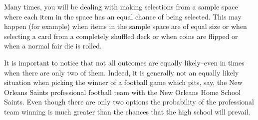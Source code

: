 \documentclass[10pt,]{book}
\theoremstyle{plain}
\theoremstyle{definition}
\theoremstyle{definition}
\theoremstyle{definition}
\numberwithin{equation}{section}
\begin{document}
	Many times, you will be dealing with making selections from a sample space where each item in the space has an equal chance of being selected. This may happen (for example) when items in the sample space are of equal size or when selecting a card from a completely shuffled deck or when coins are flipped or when a normal fair die is rolled. 
\par
It is important to notice that not all outcomes are equally likely--even in times when there are only two of them. Indeed, it is generally not an equally likely situation when picking the winner of a football game which pits, say, the New Orleans Saints professional football team with the New Orleans Home School Saints. Even though there are only two options the probability of the professional team winning is much greater than the chances that the high school will prevail. 
\par
\end{document}
